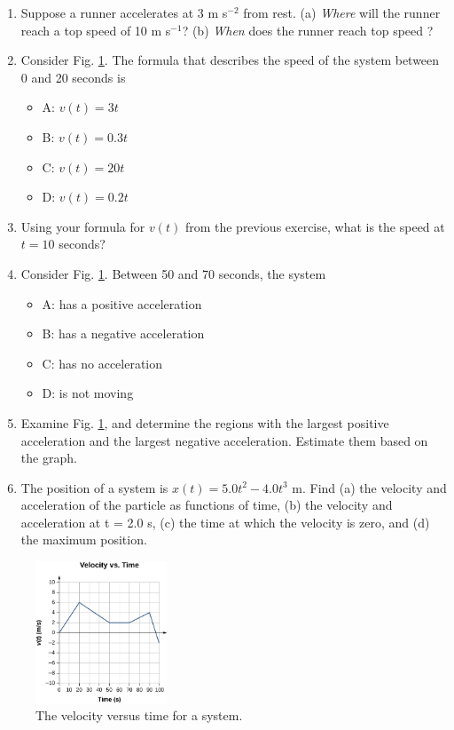 \documentclass{article}
\begin{document}
\begin{enumerate}
\item Suppose a runner accelerates at 3 m s$^{-2}$ from rest.  (a) \textit{Where} will the runner reach a top speed of 10 m s$^{-1}$? (b) \textit{When} does the runner reach top speed ? \\ \vspace{1.5cm}
\item Consider Fig. \ref{fig:graph}.  The formula that describes the speed of the system between 0 and 20 seconds is
\begin{itemize}
\item A: $v(t) = 3 t$
\item B: $v(t) = 0.3 t$
\item C: $v(t) = 20 t$
\item D: $v(t) = 0.2 t$
\end{itemize}
\item Using your formula for $v(t)$ from the previous exercise, what is the speed at $t = 10$ seconds? \\ \vspace{0.5cm}
\item Consider Fig. \ref{fig:graph}.  Between 50 and 70 seconds, the system
\begin{itemize}
\item A: has a positive acceleration
\item B: has a negative acceleration
\item C: has no acceleration
\item D: is not moving
\end{itemize}
\item Examine Fig. \ref{fig:graph}, and determine the regions with the largest positive acceleration and the largest negative acceleration.  Estimate them based on the graph. \\ \vspace{2cm}
\item The position of a system is $x(t)=5.0t^2 - 4.0t^3$ m. Find (a) the velocity and acceleration of the particle as functions of time, (b) the velocity and acceleration at t = 2.0 s, (c) the time at which the velocity is zero, and (d) the maximum position.
\end{enumerate}

\begin{figure}
\centering
\includegraphics[width=0.35\textwidth]{figures/v_vs_t.jpeg}
\caption{\label{fig:graph} The velocity versus time for a system.}
\end{figure}
\end{document}
